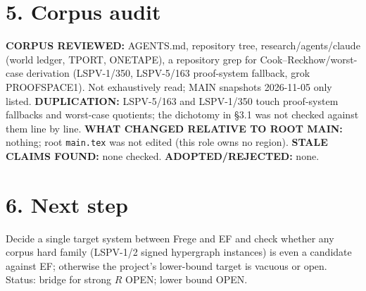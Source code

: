 \documentclass{article}
\begin{document}
\section*{5. Corpus audit}
\textbf{CORPUS REVIEWED:} AGENTS.md, repository tree, research/agents/claude (world ledger, TPORT, ONETAPE), a repository grep for Cook--Reckhow/worst-case derivation (LSPV-1/350, LSPV-5/163 proof-system fallback, grok PROOFSPACE1). Not exhaustively read; MAIN snapshots 2026-11-05 only listed. \textbf{DUPLICATION:} LSPV-5/163 and LSPV-1/350 touch proof-system fallbacks and worst-case quotients; the dichotomy in \S3.1 was not checked against them line by line. \textbf{WHAT CHANGED RELATIVE TO ROOT MAIN:} nothing; root \texttt{main.tex} was not edited (this role owns no region). \textbf{STALE CLAIMS FOUND:} none checked. \textbf{ADOPTED/REJECTED:} none.

\section*{6. Next step}
Decide a single target system between Frege and EF and check whether any corpus hard family (LSPV-1/2 signed hypergraph instances) is even a candidate against EF; otherwise the project's lower-bound target is vacuous or open. Status: bridge for strong $R$ OPEN; lower bound OPEN.
\end{document}
